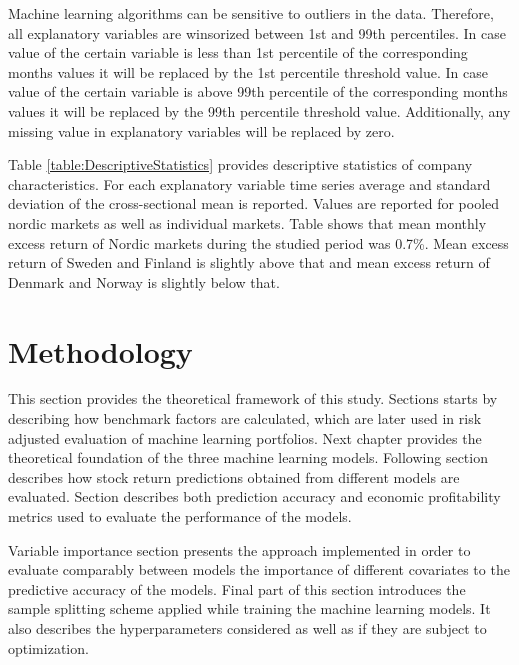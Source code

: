 \documentclass{article}
\begin{document}
Machine learning algorithms can be sensitive to outliers in the data. Therefore, all explanatory variables are winsorized between 1st and 99th percentiles. In case value of the certain variable is less than 1st percentile of the corresponding months values it will be replaced by the 1st percentile threshold value. In case value of the certain variable is above 99th percentile of the corresponding months values it will be replaced by the 99th percentile threshold value. %
Additionally, any missing value in explanatory variables will be replaced by zero. \par

Table \ref{table:DescriptiveStatistics} provides descriptive statistics of company characteristics. For each explanatory variable time series average and standard deviation of the cross-sectional mean is reported. Values are reported for pooled nordic markets as well as individual markets. Table shows that mean monthly excess return of Nordic markets during the studied period was 0.7\%. Mean excess return of Sweden and Finland is slightly above that and mean excess return of Denmark and Norway is slightly below that. \par





\section{Methodology} \label{Methodology}

This section provides the theoretical framework of this study. Sections starts by describing how benchmark factors are calculated, which are later used in risk adjusted evaluation of machine learning portfolios. Next chapter provides the theoretical foundation of the three machine learning models. Following section describes how stock return predictions obtained from different models are evaluated. Section describes both prediction accuracy and economic profitability metrics used to evaluate the performance of the models. \par

Variable importance section presents the approach implemented in order to evaluate comparably between models the importance of different covariates to the predictive accuracy of the models. Final part of this section introduces the sample splitting scheme applied while training the machine learning models. It also describes the hyperparameters considered as well as if they are subject to optimization. \par
\end{document}
